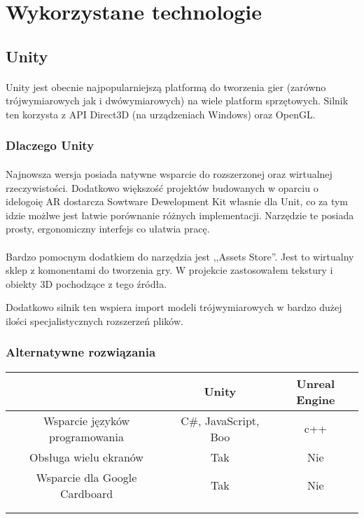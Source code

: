 \newpage
\section{Wykorzystane technologie}

\subsection{Unity}
\paragraph{}
Unity jest obecnie najpopularniejszą platformą do tworzenia gier (zarówno trójwymiarowych jak i dwówymiarowych) na wiele platform sprzętowych. Silnik ten korzysta z API Direct3D (na urządzeniach Windows) oraz OpenGL.
\subsubsection{Dlaczego Unity}
\paragraph{}
Najnowsza wersja posiada natywne wsparcie do rozszerzonej oraz wirtualnej rzeczywistości. Dodatkowo większość projektów budowanych w oparciu o idelogoię AR dostarcza Sowtware Dewelopment Kit własnie dla Unit, co za tym idzie możlwe jest łatwie porównanie różnych implementacji.
Narzędzie te posiada prosty, ergonomiczny interfejs co ułatwia pracę.
\paragraph{}
Bardzo pomocnym dodatkiem do narzędzia jest ,,Assets Store''. Jest to wirtualny sklep z komonentami do tworzenia gry. W projekcie zastosowałem tekstury i obiekty 3D pochodzące z tego źródła.

Dodatkowo silnik ten wspiera import modeli trójwymiarowych w bardzo dużej ilości specjalistycznych rozszerzeń plików.

\subsubsection{Alternatywne rozwiązania}
 \begin{tabular}{|c|c|c|}
 \hline
 \ & Unity & Unreal Engine \\ 
  \hline
 Wsparcie języków programowania & C\#, JavaScript, Boo & c++ \\  
  \hline
 Obsługa wielu ekranów & Tak & Nie \\
 \hline  
  Wsparcie dla Google Cardboard & Tak & Nie \\
  \hline   
  &  &  \\
  \hline   
  &  &  \\
  \hline   
\end{tabular}


